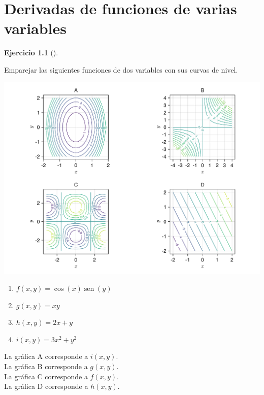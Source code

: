 \documentclass[
  a4paper,
]{scrreport}
\theoremstyle{definition}
\newtheorem{exercise}{Ejercicio}[chapter]
\theoremstyle{remark}
\begin{document}

\chapter{Derivadas de funciones de varias
variables}\label{derivadas-de-funciones-de-varias-variables}

\begin{exercise}[]\protect\hypertarget{exr-curvas-nivel}{}\label{exr-curvas-nivel}

Emparejar las siguientes funciones de dos variables con sus curvas de
nivel.

\includegraphics{img/derivadas-funciones-varias-variables/curvas-nivel.pdf}

\begin{enumerate}
\def\labelenumi{\alph{enumi}.}
\item
  \(f(x,y) = \cos(x)\operatorname{sen}(y)\)
\item
  \(g(x,y) = xy\)
\item
  \(h(x,y) = 2x+y\)
\item
  \(i(x,y) = 3x^2 + y^2\)
\end{enumerate}

\end{exercise}

\begin{tcolorbox}[enhanced jigsaw, left=2mm, coltitle=black, colbacktitle=quarto-callout-tip-color!10!white, opacitybacktitle=0.6, colback=white, breakable, titlerule=0mm, toptitle=1mm, rightrule=.15mm, bottomtitle=1mm, bottomrule=.15mm, toprule=.15mm, leftrule=.75mm, arc=.35mm, opacityback=0, title=\textcolor{quarto-callout-tip-color}{\faLightbulb}\hspace{0.5em}{Solución}, colframe=quarto-callout-tip-color-frame]

La gráfica A corresponde a \(i(x,y)\).\\
La gráfica B corresponde a \(g(x,y)\).\\
La gráfica C corresponde a \(f(x,y)\).\\
La gráfica D corresponde a \(h(x,y)\).

\end{tcolorbox}
\end{document}
